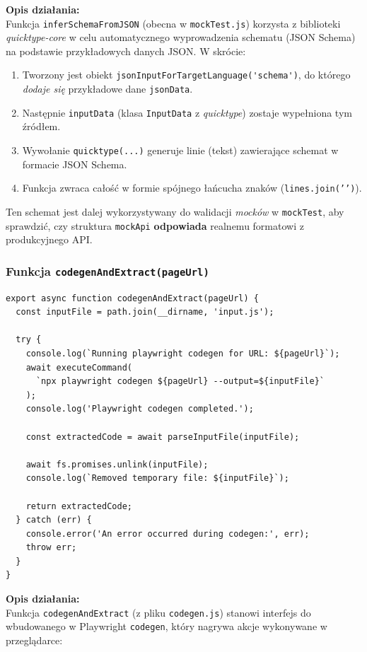 \documentclass[12pt]{report}
\begin{document}
\noindent
\textbf{Opis działania:}\\
Funkcja \verb|inferSchemaFromJSON| (obecna w \texttt{mockTest.js}) korzysta z biblioteki \emph{quicktype-core} w celu automatycznego wyprowadzenia schematu (JSON Schema) na podstawie przykładowych danych JSON. W skrócie:

\begin{enumerate}
  \item Tworzony jest obiekt \verb|jsonInputForTargetLanguage('schema')|, do którego \emph{dodaje się} przykładowe dane \verb|jsonData|.
  \item Następnie \verb|inputData| (klasa \verb|InputData| z \emph{quicktype}) zostaje wypełniona tym źródłem.
  \item Wywołanie \verb|quicktype(...)| generuje linie (tekst) zawierające schemat w formacie JSON Schema.
  \item Funkcja zwraca całość w formie spójnego łańcucha znaków (\texttt{lines.join('\n')}).
\end{enumerate}

Ten schemat jest dalej wykorzystywany do walidacji \emph{mocków} w \texttt{mockTest}, aby sprawdzić, czy struktura \texttt{mockApi} \textbf{odpowiada} realnemu formatowi z produkcyjnego API.

\subsubsection{Funkcja \texttt{codegenAndExtract(pageUrl)}}
\label{sec:codegenAndExtract}

\begin{verbatim}
export async function codegenAndExtract(pageUrl) {
  const inputFile = path.join(__dirname, 'input.js');

  try {
    console.log(`Running playwright codegen for URL: ${pageUrl}`);
    await executeCommand(
      `npx playwright codegen ${pageUrl} --output=${inputFile}`
    );
    console.log('Playwright codegen completed.');

    const extractedCode = await parseInputFile(inputFile);

    await fs.promises.unlink(inputFile);
    console.log(`Removed temporary file: ${inputFile}`);

    return extractedCode;
  } catch (err) {
    console.error('An error occurred during codegen:', err);
    throw err;
  }
}
\end{verbatim}

\noindent
\textbf{Opis działania:}\\
Funkcja \verb|codegenAndExtract| (z pliku \verb|codegen.js|) stanowi interfejs do wbudowanego w Playwright \texttt{codegen}, który nagrywa akcje wykonywane w przeglądarce:
\end{document}
